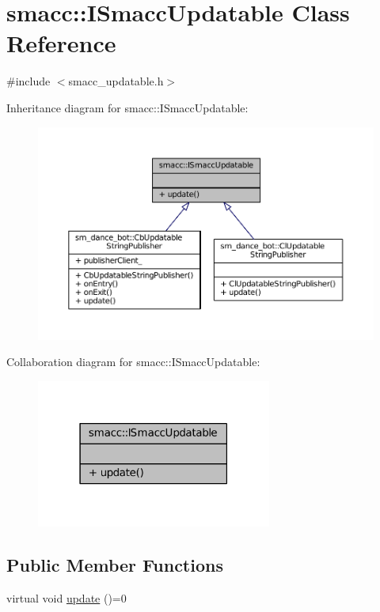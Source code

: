 \hypertarget{classsmacc_1_1ISmaccUpdatable}{}\section{smacc\+:\+:I\+Smacc\+Updatable Class Reference}
\label{classsmacc_1_1ISmaccUpdatable}


{\ttfamily \#include $<$smacc\+\_\+updatable.\+h$>$}



Inheritance diagram for smacc\+:\+:I\+Smacc\+Updatable\+:
\nopagebreak
\begin{figure}[H]
\begin{center}
\leavevmode
\includegraphics[width=350pt]{classsmacc_1_1ISmaccUpdatable__inherit__graph}
\end{center}
\end{figure}


Collaboration diagram for smacc\+:\+:I\+Smacc\+Updatable\+:
\nopagebreak
\begin{figure}[H]
\begin{center}
\leavevmode
\includegraphics[width=219pt]{classsmacc_1_1ISmaccUpdatable__coll__graph}
\end{center}
\end{figure}
\subsection*{Public Member Functions}
\begin{DoxyCompactItemize}
\item 
virtual void \hyperlink{classsmacc_1_1ISmaccUpdatable_a84ee0520cbefdb1d412bed54650b028e}{update} ()=0
\end{DoxyCompactItemize}


